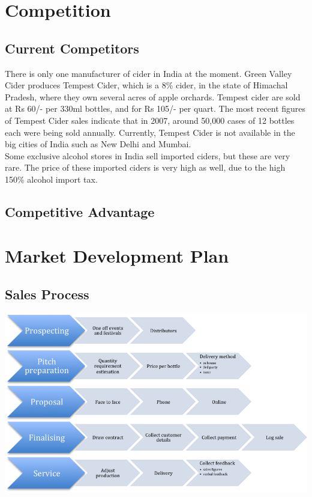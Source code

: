 \documentclass[11pt]{article}
\begin{document}
\newpage
\section{Competition}
	\subsection{Current Competitors}
There is only one manufacturer of cider in India at the moment. Green Valley Cider produces Tempest Cider, which is a 8\% cider, in the state of Himachal Pradesh, where they own several acres of apple orchards. Tempest cider are sold at Rs 60/- per 330ml bottles, and for Rs 105/- per quart. The most recent figures of Tempest Cider sales indicate that in 2007, around 50,000 cases of 12 bottles each were being sold annually. Currently, Tempest Cider is not available in the big cities of India such as New Delhi and Mumbai. \\

Some exclusive alcohol stores in India sell imported ciders, but these are very rare. The price of these imported ciders is very high as well, due to the high 150\% alcohol import tax.

  \subsection{Competitive Advantage}

\newpage
\section{Market Development Plan}
  \subsection{Sales Process}
  \includegraphics[width=\textwidth,keepaspectratio]{./process.png}
\end{document}

